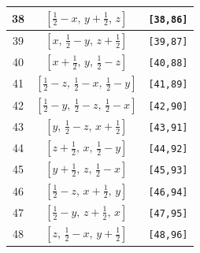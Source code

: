 \documentclass[fleqn,8pt]{jsarticle}
\begin{document}
\begin{longtable}{ccc}
38 & $\left[ \frac{1}{2} - x,\, y + \frac{1}{2},\, z \right]$ & {\tt [38,86]} \\ \hline
39 & $\left[ x,\, \frac{1}{2} - y,\, z + \frac{1}{2} \right]$ & {\tt [39,87]} \\ \hline
40 & $\left[ x + \frac{1}{2},\, y,\, \frac{1}{2} - z \right]$ & {\tt [40,88]} \\ \hline
41 & $\left[ \frac{1}{2} - z,\, \frac{1}{2} - x,\, \frac{1}{2} - y \right]$ & {\tt [41,89]} \\ \hline
42 & $\left[ \frac{1}{2} - y,\, \frac{1}{2} - z,\, \frac{1}{2} - x \right]$ & {\tt [42,90]} \\ \hline
43 & $\left[ y,\, \frac{1}{2} - z,\, x + \frac{1}{2} \right]$ & {\tt [43,91]} \\ \hline
44 & $\left[ z + \frac{1}{2},\, x,\, \frac{1}{2} - y \right]$ & {\tt [44,92]} \\ \hline
45 & $\left[ y + \frac{1}{2},\, z,\, \frac{1}{2} - x \right]$ & {\tt [45,93]} \\ \hline
46 & $\left[ \frac{1}{2} - z,\, x + \frac{1}{2},\, y \right]$ & {\tt [46,94]} \\ \hline
47 & $\left[ \frac{1}{2} - y,\, z + \frac{1}{2},\, x \right]$ & {\tt [47,95]} \\ \hline
48 & $\left[ z,\, \frac{1}{2} - x,\, y + \frac{1}{2} \right]$ & {\tt [48,96]} \\
\end{longtable}
\end{document}
